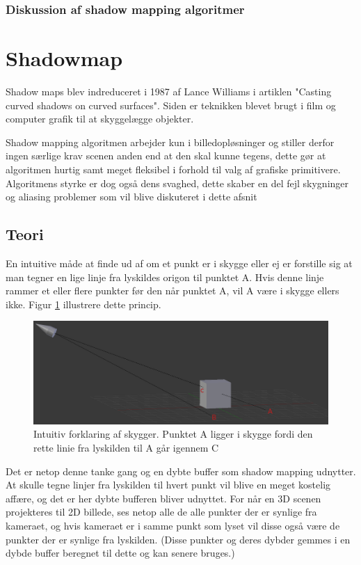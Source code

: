 \documentclass[11pt,a4paper]{article}
\begin{document}
\subsubsection{Diskussion af shadow mapping algoritmer}


\newpage 
\section{Shadowmap}

Shadow maps blev indreduceret i 1987 af Lance Williams i artiklen "Casting curved shadows on curved surfaces". Siden er teknikken blevet brugt i film og computer grafik til at skyggelægge objekter.

Shadow mapping algoritmen arbejder kun i billedopløsninger og stiller derfor ingen særlige krav scenen anden end at den skal kunne tegens, dette gør at algoritmen hurtig samt meget fleksibel i forhold til valg af grafiske primitivere. Algoritmens styrke er dog også dens svaghed, dette skaber en del fejl skygninger og aliasing problemer som vil blive diskuteret i dette afsnit


\subsection{Teori}

En intuitive måde at finde ud af om et punkt er i skygge eller ej er forstille sig at man tegner en lige linje fra lyskildes origon til punktet A. Hvis denne linje rammer et eller flere punkter før den når punktet A, vil A være i  skygge ellers ikke. Figur \ref{shadowdesc} illustrere dette princip.

\begin{figure}[ht!]
\centering
\includegraphics[width=120mm]{img/1.png}
\caption{Intuitiv forklaring af skygger. Punktet A ligger i skygge fordi den rette linie fra lyskilden til A går igennem C}
\label{shadowdesc}
\end{figure}

Det er netop denne tanke gang og en dybte buffer som shadow mapping udnytter. At skulle tegne linjer fra lyskilden til hvert punkt vil blive en meget kostelig affære, og det er her dybte bufferen bliver udnyttet. For når en 3D scenen projekteres til 2D billede, ses netop alle de alle punkter der er synlige fra kameraet, og hvis kameraet er i samme punkt som lyset vil disse også være de punkter der er synlige fra lyskilden. (Disse punkter og deres dybder gemmes i en dybde buffer beregnet til dette og kan senere bruges.)
\end{document}
